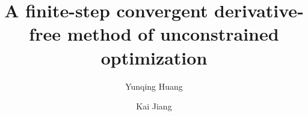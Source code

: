 \documentclass[final,1p,times]{elsarticle}
\begin{document}
\begin{frontmatter}

\title{A finite-step convergent derivative-free method of unconstrained optimization}




\author[xtu]{Yunqing Huang }


\author[xtu]{Kai Jiang }


\address[xtu]{School of Mathematics and Computational
 Science, 
 \\
Hunan Key Laboratory for Computation and Simulation in Science
and Engineering, Xiangtan University, P.R. China, 411105
 }


\end{frontmatter}
\end{document}
